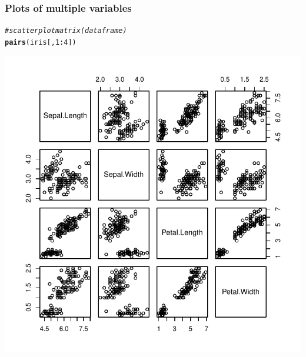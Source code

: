 \documentclass[12pt]{beamer}\usepackage[]{graphicx}\usepackage[]{color}
\makeatletter
\newcommand{\hlnum}[1]{\textcolor[rgb]{0.686,0.059,0.569}{#1}}%
\newcommand{\hlcom}[1]{\textcolor[rgb]{0.678,0.584,0.686}{\textit{#1}}}%
\newcommand{\hlopt}[1]{\textcolor[rgb]{0,0,0}{#1}}%
\newcommand{\hlstd}[1]{\textcolor[rgb]{0.345,0.345,0.345}{#1}}%
\newcommand{\hlkwd}[1]{\textcolor[rgb]{0.737,0.353,0.396}{\textbf{#1}}}%
\newenvironment{kframe}{%
 \def\at@end@of@kframe{}%
 \ifinner\ifhmode%
  \def\at@end@of@kframe{\end{minipage}}%
  \begin{minipage}{\columnwidth}%
 \fi\fi%
 \def\FrameCommand##1{\hskip\@totalleftmargin \hskip-\fboxsep
 \colorbox{shadecolor}{##1}\hskip-\fboxsep
     \hskip-\linewidth \hskip-\@totalleftmargin \hskip\columnwidth}%
 \MakeFramed {\advance\hsize-\width
   \@totalleftmargin\z@ \linewidth\hsize
   \@setminipage}}%
 {\par\unskip\endMakeFramed%
 \at@end@of@kframe}
\newenvironment{knitrout}{}{} %
\makeatother
\begin{document}
\begin{frame}[fragile]
\frametitle{Plots of multiple variables}
\begin{knitrout}\footnotesize
{}\color{fgcolor}\begin{kframe}
\begin{alltt}
\hlcom{# scatter plot matrix (data frame)}
\hlkwd{pairs}\hlstd{(iris[ ,} \hlnum{1}\hlopt{:}\hlnum{4}\hlstd{])}
\end{alltt}
\end{kframe}

{\centering \includegraphics[width=.6\linewidth,height=.6\linewidth]{figure/unnamed-chunk-22-1} 

}



\end{knitrout}
\end{frame}

\end{document}
